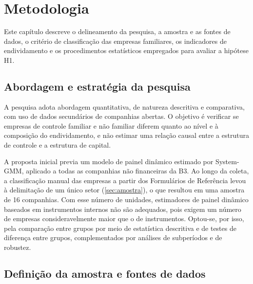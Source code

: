 \chapter{Metodologia}\label{cap:metodologia}

Este capítulo descreve o delineamento da pesquisa, a amostra e as fontes de dados,
o critério de classificação das empresas familiares, os indicadores de
endividamento e os procedimentos estatísticos empregados para avaliar a hipótese
H1.

\section{Abordagem e estratégia da pesquisa}\label{sec:abordagem}

A pesquisa adota abordagem quantitativa, de natureza descritiva e comparativa, com
uso de dados secundários de companhias abertas. O objetivo é verificar se empresas
de controle familiar e não familiar diferem quanto ao nível e à composição do
endividamento, e não estimar uma relação causal entre a estrutura de controle e a
estrutura de capital.

A proposta inicial previa um modelo de painel dinâmico estimado por System-GMM,
aplicado a todas as companhias não financeiras da B3. Ao longo da coleta, a
classificação manual das empresas a partir dos Formulários de Referência levou à
delimitação de um único setor (\autoref{sec:amostra}), o que resultou em uma
amostra de 16 companhias. Com esse número de unidades, estimadores de painel
dinâmico baseados em instrumentos internos não são adequados, pois exigem um
número de empresas consideravelmente maior que o de instrumentos. Optou-se, por
isso, pela comparação entre grupos por meio de estatística descritiva e de testes
de diferença entre grupos, complementados por análises de subperíodos e de
robustez.

\section{Definição da amostra e fontes de dados}\label{sec:amostra}

